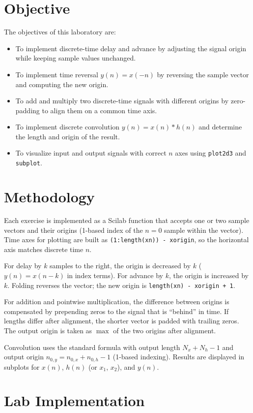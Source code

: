 \documentclass[12pt,a4paper]{article}
\begin{document}
\section{Objective}
The objectives of this laboratory are:
\begin{itemize}
\item To implement discrete-time delay and advance by adjusting the signal origin while keeping sample values unchanged.
\item To implement time reversal $y(n)=x(-n)$ by reversing the sample vector and computing the new origin.
\item To add and multiply two discrete-time signals with different origins by zero-padding to align them on a common time axis.
\item To implement discrete convolution $y(n)=x(n)*h(n)$ and determine the length and origin of the result.
\item To visualize input and output signals with correct $n$ axes using \texttt{plot2d3} and \texttt{subplot}.
\end{itemize}

\section{Methodology}
Each exercise is implemented as a Scilab function that accepts one or two sample vectors and their origins (1-based index of the $n=0$ sample within the vector). Time axes for plotting are built as \texttt{(1:length(xn)) - xorigin}, so the horizontal axis matches discrete time $n$.

For delay by $k$ samples to the right, the origin is decreased by $k$ ($y(n)=x(n-k)$ in index terms). For advance by $k$, the origin is increased by $k$. Folding reverses the vector; the new origin is \texttt{length(xn) - xorigin + 1}.

For addition and pointwise multiplication, the difference between origins is compensated by prepending zeros to the signal that is ``behind'' in time. If lengths differ after alignment, the shorter vector is padded with trailing zeros. The output origin is taken as $\max$ of the two origins after alignment.

Convolution uses the standard formula with output length $N_x+N_h-1$ and output origin $n_{0,y}=n_{0,x}+n_{0,h}-1$ (1-based indexing). Results are displayed in subplots for $x(n)$, $h(n)$ (or $x_1$, $x_2$), and $y(n)$.

\section{Lab Implementation}
\end{document}
